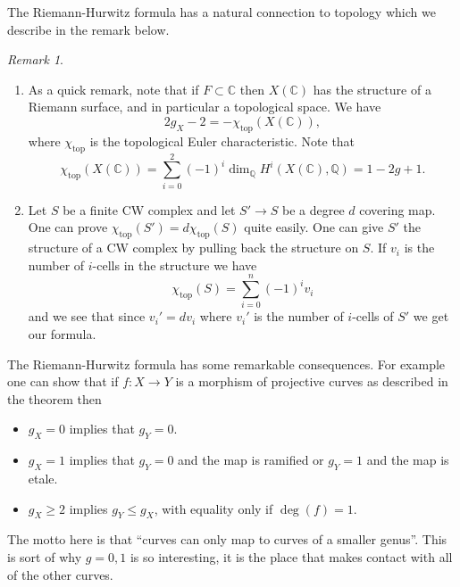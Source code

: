 \documentclass[12pt]{article}
\numberwithin{equation}{section}
\theoremstyle{definition}
\theoremstyle{remark}
\newtheorem{remark}[theorem]{Remark}
\newcommand{\QQ}{\mathbb{Q}}
\newcommand{\CC}{\mathbb{C}}
\renewcommand{\top}{\operatorname{top}}
\renewcommand{\top}{\operatorname{top}}
\begin{document}
The Riemann-Hurwitz formula has a natural connection to topology which we describe in the remark below.
\begin{remark}
\begin{enumerate}
\item As a quick remark, note that if $F \subset \CC$ then $X(\CC)$ has the structure of a Riemann surface, and in particular a topological space. We have
 $$ 2 g_X - 2 = - \chi_{\top}(X(\CC)),$$
where $\chi_{\top}$ is the topological Euler characteristic.
Note that 
 $$\chi_{\top}(X(\CC)) = \sum_{i=0}^2(-1)^i \dim_{\QQ}H^i(X(\CC),\QQ) = 1-2g+1. $$
 \item Let $S$ be a finite CW complex and let $S' \to S$ be a degree $d$ covering map. One can prove $\chi_{\top}(S') = d\chi_{\top}(S)$ quite easily. 
 One can give $S'$ the structure of a CW complex by pulling back the structure on $S$. 
 If $v_i$ is the number of $i$-cells in the structure we have 
  $$ \chi_{\top}(S) = \sum_{i=0}^n (-1)^i v_i $$
 and we see that since $v_i'=dv_i$ where $v_i'$ is the number of $i$-cells of $S'$ we get our formula.
\end{enumerate}

The Riemann-Hurwitz formula has some remarkable consequences. 
For example one can show that if $f:X\to Y$ is a morphism of projective curves as described in the theorem then 
\begin{itemize}
	\item $g_X=0$ implies that $g_Y=0$.
	\item $g_X=1$ implies that $g_Y=0$ and the map is ramified or $g_Y=1$ and the map is etale. 
	\item $g_X\geq 2$ implies $g_Y \leq g_X$, with equality only if $\deg(f)=1$. 
\end{itemize}
The motto here is that ``curves can only map to curves of a smaller genus''. 
This is sort of why $g=0,1$ is so interesting, it is the place that makes contact with all of the other curves. 
\end{remark}
\end{document}

